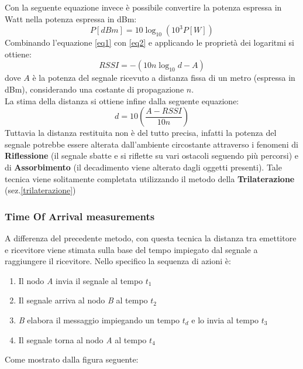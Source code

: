 Con la seguente equazione invece è possibile convertire la potenza espressa in Watt nella potenza espressa in dBm:
\begin{equation}
P[dBm] = 10\log_{10}(10^3P[W])
\label{eq2}
\end{equation}
Combinando l'equazione \ref{eq1} con \ref{eq2} e applicando le proprietà dei logaritmi si ottiene:
\begin{equation}
RSSI = -(10 n \log_{10} d - A)
\label{eq3}
\end{equation}
dove $A$ è la potenza del segnale ricevuto a distanza fissa di un metro (espressa in dBm), considerando una costante di propagazione $n$.\\
La stima della distanza si ottiene infine dalla seguente equazione:
\begin{equation}
d = 10 (\frac{A - RSSI}{10n})
\label{eq4}
\end{equation}
Tuttavia la distanza restituita non è del tutto precisa, infatti la potenza del segnale potrebbe essere alterata dall'ambiente circostante attraverso i fenomeni di \textbf{Riflessione} (il segnale sbatte e si riflette su vari ostacoli seguendo più percorsi) e di \textbf{Assorbimento} (il decadimento viene alterato dagli oggetti presenti). Tale tecnica viene solitamente completata utilizzando il metodo della \textbf{Trilaterazione} (sez.\ref{trilaterazione})\\


\subsubsection{Time Of Arrival measurements}  
\label{toa}
A differenza del precedente metodo, con questa tecnica la distanza tra emettitore e ricevitore viene stimata sulla base del tempo impiegato dal segnale a raggiungere il ricevitore. Nello specifico la sequenza di azioni è:
\begin{enumerate}
	\item Il nodo \textit{A} invia il segnale al tempo $t_1$
	\item Il segnale arriva al nodo \textit{B} al tempo $t_2$
	\item \textit{B} elabora il messaggio impiegando un tempo $t_d$ e lo invia al tempo $t_3$
	\item Il segnale torna al nodo \textit{A} al tempo $t_4$
\end{enumerate}
Come mostrato dalla figura seguente:

